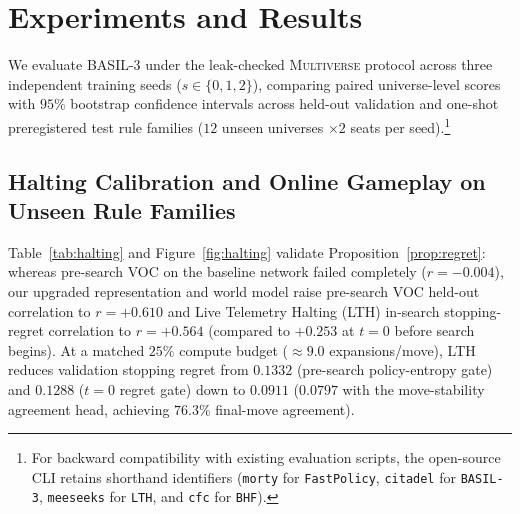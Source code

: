 \documentclass[preprint,3p,times]{elsarticle}
\begin{document}
\section{Experiments and Results}
\label{sec:experiments}

We evaluate BASIL-3 under the leak-checked \textsc{Multiverse} protocol across three independent training seeds ($s \in \{0, 1, 2\}$), comparing paired universe-level scores with $95\%$ bootstrap confidence intervals across held-out validation and one-shot preregistered test rule families ($12$ unseen universes $\times 2$ seats per seed).\footnote{For backward compatibility with existing evaluation scripts, the open-source CLI retains shorthand identifiers (\texttt{morty} for \texttt{FastPolicy}, \texttt{citadel} for \texttt{BASIL-3}, \texttt{meeseeks} for \texttt{LTH}, and \texttt{cfc} for \texttt{BHF}).}

\subsection{Halting Calibration and Online Gameplay on Unseen Rule Families}
Table~\ref{tab:halting} and Figure~\ref{fig:halting} validate Proposition~\ref{prop:regret}: whereas pre-search VOC on the baseline network failed completely ($r = -0.004$), our upgraded representation and world model raise pre-search VOC held-out correlation to $r = +0.610$ and Live Telemetry Halting (LTH) in-search stopping-regret correlation to $r = +0.564$ (compared to $+0.253$ at $t=0$ before search begins). At a matched $25\%$ compute budget ($\approx 9.0$ expansions/move), LTH reduces validation stopping regret from $0.1332$ (pre-search policy-entropy gate) and $0.1288$ ($t=0$ regret gate) down to $0.0911$ ($0.0797$ with the move-stability agreement head, achieving $76.3\%$ final-move agreement).
\end{document}
